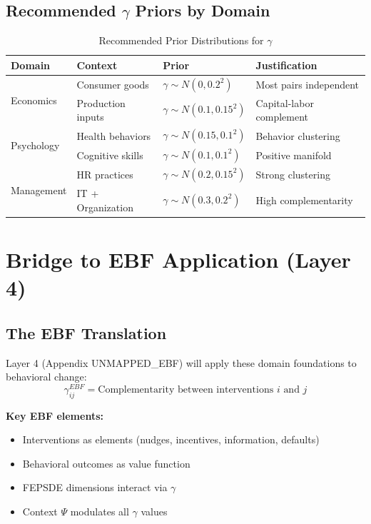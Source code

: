 \subsection{Recommended $\gamma$ Priors by Domain}

\begin{table}[h]
\centering
\caption{Recommended Prior Distributions for $\gamma$}
\label{tab:priors}
\renewcommand{\arraystretch}{1.3}
\begin{tabular}{@{}llll@{}}
\toprule
\textbf{Domain} & \textbf{Context} & \textbf{Prior} & \textbf{Justification} \\
\midrule
\multirow{2}{*}{Economics} & Consumer goods & $\gamma \sim N(0, 0.2^2)$ & Most pairs independent \\
 & Production inputs & $\gamma \sim N(0.1, 0.15^2)$ & Capital-labor complement \\
\multirow{2}{*}{Psychology} & Health behaviors & $\gamma \sim N(0.15, 0.1^2)$ & Behavior clustering \\
 & Cognitive skills & $\gamma \sim N(0.1, 0.1^2)$ & Positive manifold \\
\multirow{2}{*}{Management} & HR practices & $\gamma \sim N(0.2, 0.15^2)$ & Strong clustering \\
 & IT + Organization & $\gamma \sim N(0.3, 0.2^2)$ & High complementarity \\
\bottomrule
\end{tabular}
\end{table}

\section{Bridge to EBF Application (Layer 4)}
\label{sec:bridge}

\subsection{The EBF Translation}

\begin{tcolorbox}[colback=red!5!white,colframe=red!75!black,title=\textbf{From Domain Foundations to EBF}]
Layer 4 (Appendix UNMAPPED_EBF) will apply these domain foundations to behavioral change:
\begin{equation}
\gamma^{EBF}_{ij} = \text{Complementarity between interventions } i \text{ and } j
\end{equation}

\textbf{Key EBF elements:}
\begin{itemize}[noitemsep]
    \item Interventions as elements (nudges, incentives, information, defaults)
    \item Behavioral outcomes as value function
    \item FEPSDE dimensions interact via $\gamma$
    \item Context $\Psi$ modulates all $\gamma$ values
\end{itemize}
\end{tcolorbox}

